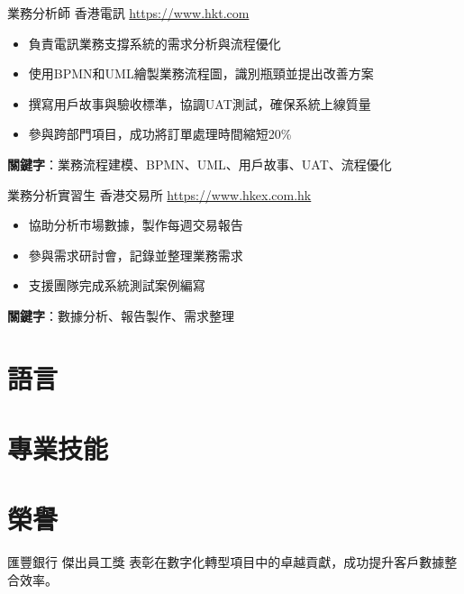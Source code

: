 \documentclass[a4paper, serif, 10pt]{moderncv}
\begin{document}
        {業務分析師}
        {香港電訊}
        {\url{https://www.hkt.com}}
        {}
        {\begin{itemize}
\item 負責電訊業務支撐系統的需求分析與流程優化
\item 使用BPMN和UML繪製業務流程圖，識別瓶頸並提出改善方案
\item 撰寫用戶故事與驗收標準，協調UAT測試，確保系統上線質量
\item 參與跨部門項目，成功將訂單處理時間縮短20\%
\end{itemize}
\textbf{關鍵字}：業務流程建模、BPMN、UML、用戶故事、UAT、流程優化}

        {業務分析實習生}
        {香港交易所}
        {\url{https://www.hkex.com.hk}}
        {}
        {\begin{itemize}
\item 協助分析市場數據，製作每週交易報告
\item 參與需求研討會，記錄並整理業務需求
\item 支援團隊完成系統測試案例編寫
\end{itemize}
\textbf{關鍵字}：數據分析、報告製作、需求整理}
\section{語言}

\section{專業技能}

\section{榮譽}

        {匯豐銀行}
        {傑出員工獎}
        {}
        {}
        {表彰在數字化轉型項目中的卓越貢獻，成功提升客戶數據整合效率。}
\end{document}
